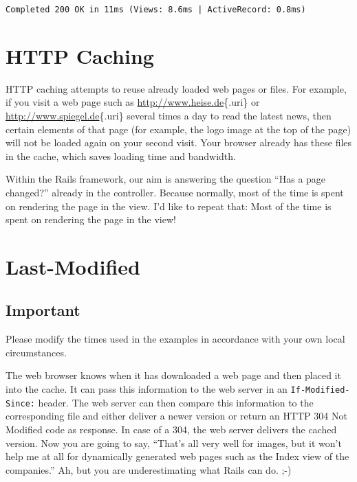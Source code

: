 \documentclass[a4paper]{book}
\begin{document}
\begin{shaded}\begin{verbatim}
Completed 200 OK in 11ms (Views: 8.6ms | ActiveRecord: 0.8ms)
\end{verbatim}\end{shaded}

\section{HTTP Caching}\label{http-caching}

HTTP caching attempts to reuse already loaded web pages or files. For example, if you visit a web page such as \url{http://www.heise.de}\{.uri\} or \url{http://www.spiegel.de}\{.uri\} several times a day to read the latest news, then certain elements of that page (for example, the logo image at the top of the page) will not be loaded again on your second visit. Your browser already has these files in the cache, which saves loading time and bandwidth.

Within the Rails framework, our aim is answering the question “Has a page changed?” already in the controller. Because normally, most of the time is spent on rendering the page in the view. I'd like to repeat that: Most of the time is spent on rendering the page in the view!

\section{Last-Modified}\label{last-modified}

\subsection{Important}\label{important-16}

Please modify the times used in the examples in accordance with your own local circumstances.

The web browser knows when it has downloaded a web page and then placed it into the cache. It can pass this information to the web server in an \texttt{If-Modified-Since:} header. The web server can then compare this information to the corresponding file and either deliver a newer version or return an HTTP 304 Not Modified code as response. In case of a 304, the web server delivers the cached version. Now you are going to say, “That's all very well for images, but it won't help me at all for dynamically generated web pages such as the Index view of the companies.” Ah, but you are underestimating what Rails can do. ;-)
\end{document}
